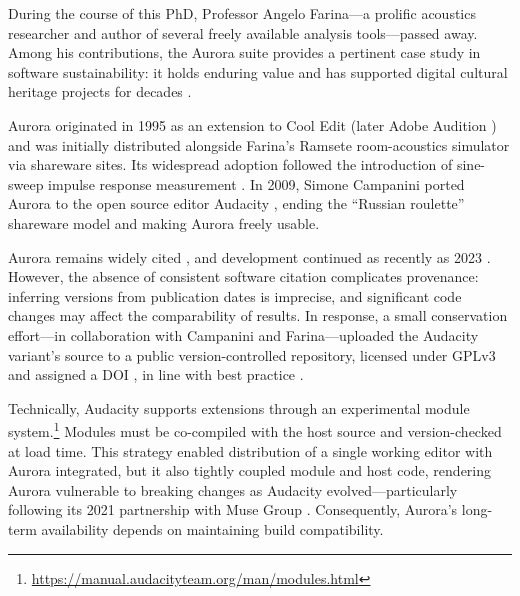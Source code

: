 During the course of this PhD, Professor Angelo Farina---a prolific acoustics
researcher and author of several freely available analysis tools---passed away.
Among his contributions, the Aurora suite provides a pertinent case study in
software sustainability: it holds enduring value and has supported digital
cultural heritage projects for decades \cite{fausti_acoustic_2000,
frey_acoustical_2013, almagropastor_assessing_2021}.

Aurora originated in 1995 \cite{farina_auralization_1995} as an extension to
Cool Edit \cite{tronchin_acoustics_1997} (later Adobe Audition
\cite{farina_listening_2004}) and was initially distributed alongside Farina’s
Ramsete room-acoustics simulator \cite{farina_aurora_1995} via shareware sites.
Its widespread adoption followed the introduction of sine-sweep impulse response
measurement \cite{farina_aurora_2000}. In 2009, Simone Campanini ported Aurora
to the open source editor Audacity \cite{farina_new_2009}, ending the ``Russian
roulette'' shareware model \cite{farina_registration_2007} and making Aurora
freely usable.

Aurora remains widely cited \cite{fontana_highly_2024, popp_speech_2024,
denti_pan_2024}, and development continued as recently as 2023
\cite{bevilacqua_new_2023}. However, the absence of consistent software citation
complicates provenance: inferring versions from publication dates is imprecise,
and significant code changes may affect the comparability of results. In
response, a small conservation effort---in collaboration with Campanini and
Farina---uploaded the Audacity variant’s source to a public version-controlled
repository, licensed under GPLv3 and assigned a DOI \cite{farina_aurora_2025},
in line with best practice \cite{stall_journal_2023, hong_how_2019}.

Technically, Audacity supports extensions through an experimental module
system.\footnote{\url{https://manual.audacityteam.org/man/modules.html}} Modules
must be co-compiled with the host source and version-checked at load time. This
strategy enabled distribution of a single working editor with Aurora integrated,
but it also tightly coupled module and host code, rendering Aurora vulnerable to
breaking changes as Audacity evolved---particularly following its 2021 partnership
with Muse Group \cite{prokoudine_ultimate_2021}. Consequently, Aurora’s
long-term availability depends on maintaining build compatibility.

